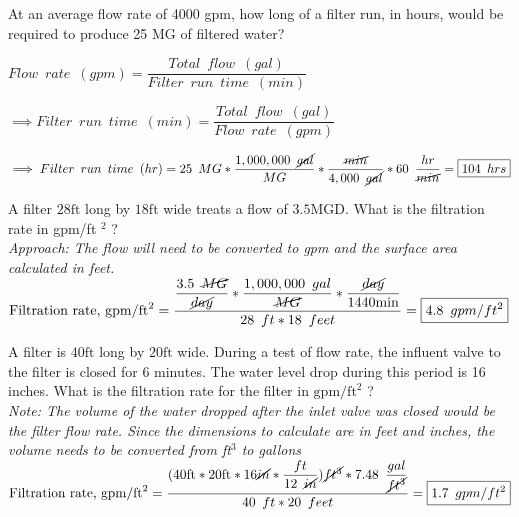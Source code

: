 \documentclass{article}
\begin{document}
\begin{enumerate}
{\item At an average flow rate of 4000 gpm, how long of a filter run, in hours, would be required to produce 25 MG of filtered water?\\

\vspace{0.2cm}

$Flow \enspace rate \enspace (gpm)=\dfrac{Total \enspace flow \enspace (gal)}{Filter \enspace run \enspace time \enspace (min)}$

\vspace{0.3cm}

$\implies Filter \enspace run \enspace time \enspace (min)=\dfrac{Total \enspace flow \enspace (gal)}{Flow \enspace rate \enspace (gpm)}$\\

\vspace{0.3cm}

$\implies Filter \enspace run \enspace time \enspace (hr)=25 \enspace MG*\dfrac{1,000,000 \enspace \cancel{gal}}{MG}*\dfrac{\cancel{min}}{4,000 \enspace \cancel{gal}}*60 \enspace \dfrac{hr}{\cancel{min}}=\boxed{104 \enspace hrs}$

\item A filter $28 \mathrm{ft}$ long by $18 \mathrm{ft}$ wide treats a flow of $3.5 \mathrm{MGD}$. What is the filtration rate in gpm/ft ${ }^{2}$ ?\\

\vspace{0.2cm}
\textit{Approach:  The flow will need to be converted to gpm and the surface area calculated in feet.}\\

$\text{Filtration rate, } \mathrm{gpm} / \mathrm{ft}^{2} = 
\dfrac{
\dfrac{3.5 \enspace \cancel{MG}}{ \cancel{day}} * \dfrac{1,000,000 \enspace gal}{\cancel{MG}}
*\dfrac{\cancel{day}}{1440 \mathrm{ min}}}
{28 \enspace ft * 18 \enspace feet}= \boxed{4.8 \enspace gpm/ft^2}$\\
\vspace{0.2cm}
\item A filter is $40 \mathrm{ft}$ long by $20 \mathrm{ft}$ wide. During a test of flow rate, the influent valve to the filter is closed for 6 minutes. The water level drop during this period is 16 inches. What is the filtration rate for the filter in $\mathrm{gpm} / \mathrm{ft}^{2}$ ?\\
\vspace{0.2cm}
\textit{Note:  The volume of the water dropped after the inlet valve was closed would be the filter flow rate.  Since the dimensions to calculate are in feet and inches, the volume needs to be converted from ft$^3$ to gallons}\\
\vspace{0.2cm}
$\text{Filtration rate, } \mathrm{gpm} / \mathrm{ft}^{2} = 
\dfrac{(
40 \mathrm{ ft}*20 \mathrm{ ft} * 16 \mathrm{\cancel{in}}*
\dfrac{ft}{12 \enspace \cancel{in}}
)
\cancel{ft^3}*7.48 \enspace 
\dfrac
{gal}
{\cancel{ft^3}}}
{40 \enspace ft * 20 \enspace feet}= \boxed{1.7\enspace gpm/ft^2}$\\

}
\end{enumerate}
\end{document}
